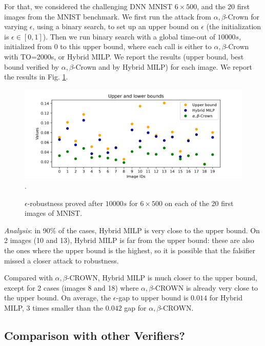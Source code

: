 For that, we considered the challenging DNN MNIST $6 \times 500$, and the 20 first images from the MNIST benchmark. We first run the attack from $\alpha,\beta$-Crown for varying $\epsilon$, using a binary search, to set up an upper bound on $\epsilon$ (the initialization is $\epsilon \in [0,1]$).
Then we run binary search with a global time-out of $10 000s$, initialized from $0$ to this upper bound, where each call is either to $\alpha,\beta$-Crown with TO=2000s, or Hybrid MILP.
We report the results (upper bound, best bound verified by $\alpha,\beta$-Crown and by Hybrid MILP) for each image. We report the results in Fig. \ref{fig2}.

\begin{figure}[t!]
	\begin{centering}
\includegraphics[scale=0.6]{epsilon.png}.
\caption{$\epsilon$-robustness proved after $10 000s$ for $6 \times 500$ on each of the 20 first images of MNIST.}
\label{fig2}
	\end{centering}
\end{figure}

{\em Analysis}: in 90\% of the cases, Hybrid MILP is very close to the upper bound. On 2 images (10 and 13), Hybrid MILP is far from the upper bound: these are also the ones where the upper bound is the highest, so it is possible that the falsifier missed a closer attack to robustness.

Compared with $\alpha,\beta$-CROWN, Hybrid MILP is much closer to the upper bound, except for 2 cases (images 8 and 18) where $\alpha,\beta$-CROWN is already very close to the upper bound. On average, the $\epsilon$-gap to upper bound is $0.014$ for Hybrid MILP, 3 times smaller than the $0.042$ gap for $\alpha,\beta$-CROWN.



\subsection{Comparison with other Verifiers?}

